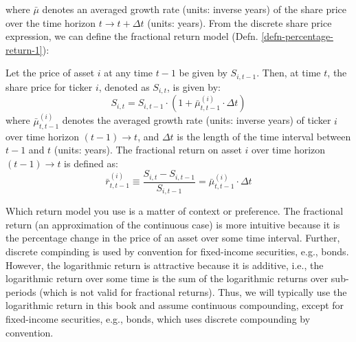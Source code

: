 \documentclass[11pt]{article}
\theoremstyle{definition}
\begin{document}
where $\bar{\mu}$ denotes an averaged growth rate (units: inverse years) of the share price over the time horizon $t\rightarrow{t+\Delta{t}}$ (units: years).
From the discrete share price expression, we can define the fractional return model (Defn. \ref{defn-percentage-return-1}):
\begin{definition}\label{defn-percentage-return-1}
Let the price of asset $i$ at any time $t-1$ be given by $S_{i,t-1}$. Then, at time $t$, the share price for ticker $i$, denoted as $S_{i,t}$, is given by:
\begin{equation}
    S_{i,t} = S_{i,t-1}\cdot\left(1+\bar{\mu}^{(i)}_{t,t-1}\cdot{\Delta{t}}\right)
\end{equation}
where $\bar{\mu}^{(i)}_{t,t-1}$ denotes the averaged growth rate (units: inverse years) of ticker $i$ over time horizon $(t-1)\rightarrow{t}$, 
and $\Delta{t}$ is the length of the time interval between $t-1$ and $t$ (units: years). The fractional return 
on asset $i$ over time horizon $(t-1)\rightarrow{t}$ is defined as: 
\begin{equation}
\bar{r}^{(i)}_{t,t-1} \equiv \frac{S_{i,t} - S_{i,t-1}}{S_{i,t-1}} = \bar{\mu}^{(i)}_{t,t-1}\cdot{\Delta{t}}
\end{equation}
\end{definition}

Which return model you use is a matter of context or preference. 
The fractional return (an approximation of the continuous case) is more intuitive because it is the percentage change in the price of an asset over some time interval.
Further, discrete compinding is used by convention for fixed-income securities, e.g., bonds.
However, the logarithmic return is attractive because it is additive, i.e., the logarithmic return over some time is the sum of the logarithmic returns over sub-periods
(which is not valid for fractional returns). 
Thus, we will typically use the logarithmic return in this book and assume continuous compounding, except for fixed-income securities, e.g., bonds, 
which uses discrete compounding by convention.
\end{document}
